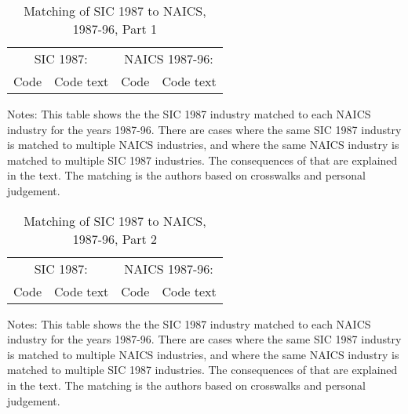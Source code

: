 \documentclass[11pt]{article}
\begin{document}
\begin{table}[!htb]
\begin{center}
\label{TAB_match5}
\caption{Matching of SIC 1987 to NAICS, 1987-96, Part 1}
{\footnotesize
\begin{tabular}{llll}
\midrule
\multicolumn{2}{c}{SIC 1987:} & \multicolumn{2}{c}{NAICS 1987-96:} \\ \cmidrule(lr){1-2} \cmidrule(lr){3-4}
Code  & Code text  & Code & Code text \\ 
\midrule

\midrule
\end{tabular}
}
\end{center}
{\footnotesize Notes: This table shows the the SIC 1987 industry matched to each NAICS industry for the years 1987-96. There are cases where the same SIC 1987 industry is matched to multiple NAICS industries, and where the same NAICS industry is matched to multiple SIC 1987 industries. The consequences of that are explained in the text. The matching is the authors based on crosswalks and personal judgement.}
\end{table}


\begin{table}[!htb]
\begin{center}
\label{TAB_match6}
\caption{Matching of SIC 1987 to NAICS, 1987-96, Part 2}
{\footnotesize
\begin{tabular}{llll}
\midrule
\multicolumn{2}{c}{SIC 1987:} & \multicolumn{2}{c}{NAICS 1987-96:} \\ \cmidrule(lr){1-2} \cmidrule(lr){3-4}
Code  & Code text  & Code & Code text \\ 
\midrule

\midrule
\end{tabular}
}
\end{center}
{\footnotesize Notes: This table shows the the SIC 1987 industry matched to each NAICS industry for the years 1987-96. There are cases where the same SIC 1987 industry is matched to multiple NAICS industries, and where the same NAICS industry is matched to multiple SIC 1987 industries. The consequences of that are explained in the text. The matching is the authors based on crosswalks and personal judgement.}
\end{table}
\end{document}
